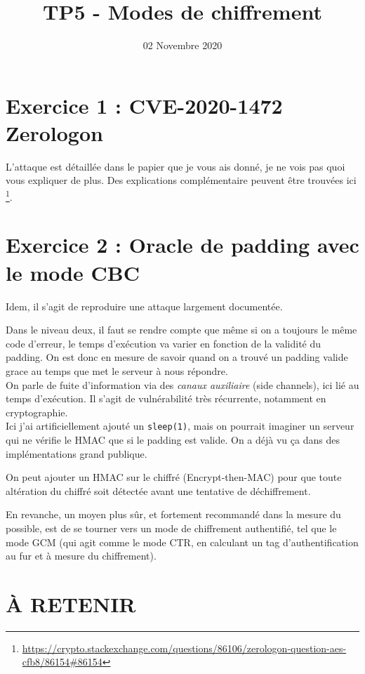 \documentclass[french,a4paper,11pt]{exam}
\title{\textbf{TP5 - Modes de chiffrement}}
\date{02 Novembre 2020}
\begin{document}
	
	\maketitle


	\section*{Exercice 1 : CVE-2020-1472 Zerologon}

	L'attaque est détaillée dans le papier que je vous ais donné, je ne vois pas quoi vous expliquer de plus. 
	Des explications complémentaire peuvent être trouvées ici \footnote{\url{https://crypto.stackexchange.com/questions/86106/zerologon-question-aes-cfb8/86154\#86154}}.
	
	\section*{Exercice 2 : Oracle de padding avec le mode CBC}
	
	Idem, il s'agit de reproduire une attaque largement documentée.

	Dans le niveau deux, il faut se rendre compte que même si on a toujours le même code d'erreur, le temps d’exécution va varier en fonction de la validité du padding. On est donc en mesure de savoir quand on a trouvé un padding valide grace au temps que met le serveur à nous répondre.\\
	On parle de fuite d'information via des \emph{canaux auxiliaire} (side channels), ici lié au temps d'exécution. Il s'agit de vulnérabilité très récurrente, notamment en cryptographie.\\ 
	Ici j'ai artificiellement ajouté un \texttt{sleep(1)}, mais on pourrait imaginer un serveur qui ne vérifie le HMAC que si le padding est valide. On a déjà vu ça dans des implémentations grand publique. 
	
	On peut ajouter un HMAC sur le chiffré (Encrypt-then-MAC) pour que toute altération du chiffré soit détectée avant une tentative de déchiffrement.
	
	En revanche, un moyen plus sûr, et fortement recommandé dans la mesure du possible, est de se tourner vers un mode de chiffrement authentifié, tel que le mode GCM (qui agit comme le mode CTR, en calculant un tag d'authentification au fur et à mesure du chiffrement).

	\section*{À RETENIR}
\end{document}
